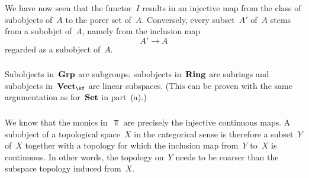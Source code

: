 We have now seen that the functor~$I$ results in an injective map from the class of subobjects of~$A$ to the porer set of~$A$.
Conversely, every subset~$A'$ of~$A$ stems from a subobjet of~$A$, namely from the inclusion map
\[
	A' \to A
\]
regarded as a subobject of~$A$.



\subsubsection{}

Subobjects in~$\mathbf{Grp}$ are subgroups, subobjects in~$\mathbf{Ring}$ are subrings and subobjects in~$\Vect{\kf}$ are linear subspaces.
(This can be proven with the same argumentation as for~$\mathbf{Set}$ in part~(a).)



\subsubsection{}

We know that the monics in~$\Top$ are precisely the injective continuous maps.
A subobject of a topological space~$X$ in the categorical sense is therefore a subset~$Y$ of~$X$ together with a topology for which the inclusion map from~$Y$ to~$X$ is continuous.
In other words, the topology on~$Y$ needs to be coarser than the subspace topology induced from~$X$.
